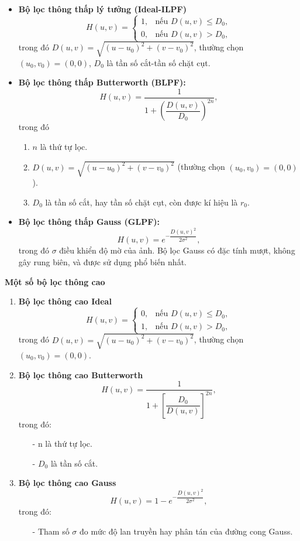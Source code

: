 \documentclass[12pt,a4paper]{report}
\numberwithin{equation}{section}
\theoremstyle{definition} %
\begin{document}
\begin{itemize}
	\item \textbf{Bộ lọc thông thấp lý tưởng (Ideal-ILPF)}
\[
H(u,v) =
\begin{cases}
1, & \text{nếu } D(u,v) \le D_0, \\[4pt]
0, & \text{nếu } D(u,v) > D_0,
\end{cases}
\]
trong đó $D(u,v) = \sqrt{(u - u_0)^2 + (v - v_0)^2}$, thường chọn $(u_0, v_0) = (0,0)$, $D_0$ là tần số cắt-tần số chặt cụt.
	\item \textbf{Bộ lọc thông thấp Butterworth (BLPF):}
	\[
	H(u,v) = \frac{1}{1 + \left(\dfrac{D(u,v)}{D_0}\right)^{2n}},
	\]
	trong đó
	\begin{enumerate}[label=$-$]
	\item 	$n$ là thứ tự lọc.
	\item  $D(u,v) = \sqrt{(u-u_0)^2 + (v-v_0)^2}$ (thường chọn $(u_0,v_0) = (0,0)$).
	\item $D_0$ là tần số cắt, hay tần số chặt cụt, còn được kí hiệu là $r_0$.
	\end{enumerate}

	\item \textbf{Bộ lọc thông thấp Gauss (GLPF):}
	\[
	H(u,v) = e^{-\dfrac{D(u,v)^2}{2\sigma^2}},
	\]
	trong đó $\sigma$ điều khiển độ mờ của ảnh. Bộ lọc Gauss có đặc tính mượt, không gây rung biên, và được sử dụng phổ biến nhất.
	
\end{itemize}
\begin{center}
\textbf{Một số bộ lọc thông cao}
\end{center}
\begin{enumerate}[label=$\bullet$]
\item \textbf{Bộ lọc thông cao Ideal}
\[
H(u,v) =
\begin{cases}
0, & \text{nếu } D(u,v) \le D_0, \\[4pt]
1, & \text{nếu } D(u,v) > D_0,
\end{cases}
\]
trong đó $D(u,v) = \sqrt{(u - u_0)^2 + (v - v_0)^2}$, thường chọn $(u_0, v_0) = (0,0)$.
\item \textbf{Bộ lọc thông cao Butterworth}
\[H(u,v) = \frac{1}{1 + \left[\dfrac{D_0}{D(u,v)}\right]^{2n}},\]
trong đó: 
\begin{enumerate}
	\item[-] n là thứ tự lọc.
	\item[-] $D_0$ là tần số cắt.

\end{enumerate}

\item \textbf{Bộ lọc thông cao Gauss}
\[H(u,v) = 1- e^{-\dfrac{D(u,v)^2}{2\sigma^2}},\]
trong đó: 
\begin{enumerate}
\item[-] Tham số $\sigma$ đo mức độ lan truyền hay phân tán của đường cong Gauss.
\end{enumerate}
\end{enumerate}
\end{document}

